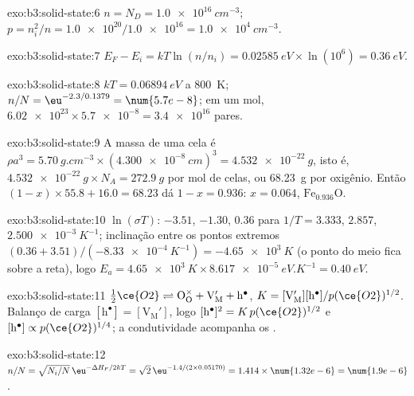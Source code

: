 \begin{solution}{exo:b3:solid-state:6}
$n = N_D = \qty{1.0e16}{cm^{-3}}$; $p = n_i^2/n = \num{1.0e20}/\num{1.0e16} = \qty{1.0e4}{cm^{-3}}$.
\end{solution}

\begin{solution}{exo:b3:solid-state:7}
$E_F - E_i = kT\ln(n/n_i) = \qty{0.02585}{eV} \times \ln(10^6) = \qty{0.36}{eV}$.
\end{solution}

\begin{solution}{exo:b3:solid-state:8}
$kT = \qty{0.06894}{eV}$ a \qty{800}{K}; $n/N = \eu^{-2.3/0.1379} = \num{5.7e-8}$; em um mol, $\num{6.02e23} \times \num{5.7e-8} = \num{3.4e16}$
pares.
\end{solution}

\begin{solution}{exo:b3:solid-state:9}
A massa de uma cela é $\rho a^3 = \qty{5.70}{g.cm^{-3}} \times (\qty{4.300e-8}{cm})^3 = \qty{4.532e-22}{g}$, isto é,
$\qty{4.532e-22}{g} \times N_A = \qty{272.9}{g}$ por mol de celas, ou \qty{68.23}{g} por oxigênio. Então
$(1 - x) \times 55.8 + 16.0 = 68.23$ dá $1 - x = 0.936$: $x = 0.064$, $\mathrm{Fe_{0.936}O}$.
\end{solution}

\begin{solution}{exo:b3:solid-state:10}
$\ln(\sigma T)$: $-3.51$, $-1.30$, $0.36$ para $1/T = 3.333$, $2.857$, $\qty{2.500e-3}{K^{-1}}$; inclinação entre os pontos extremos
$(0.36 + 3.51)/(-\qty{8.33e-4}{K^{-1}}) = -\qty{4.65e3}{K}$ (o ponto do meio fica sobre a reta), logo
$E_a = \qty{4.65e3}{K} \times \qty{8.617e-5}{eV.K^{-1}} = \qty{0.40}{eV}$.
\end{solution}

\begin{solution}{exo:b3:solid-state:11}
$\tfrac12\ce{O2} \rightleftharpoons \mathrm{O_O^{\times} + V_M' + h^{\bullet}}$, $K = [\mathrm{V_M'}][\mathrm h^\bullet]/p(\ce{O2})^{1/2}$. Balanço de carga $[\mathrm h^\bullet] = [\mathrm{V_M'}]$, logo
$[\mathrm h^\bullet]^2 = K\,p(\ce{O2})^{1/2}$ e $[\mathrm h^\bullet] \propto p(\ce{O2})^{1/4}$; a condutividade acompanha os .
\end{solution}

\begin{solution}{exo:b3:solid-state:12}
$n/N = \sqrt{N_i/N}\,\eu^{-\Delta H_F/2kT} = \sqrt 2\,\eu^{-1.4/(2 \times 0.05170)} = 1.414 \times \num{1.32e-6} = \num{1.9e-6}$.
\end{solution}

